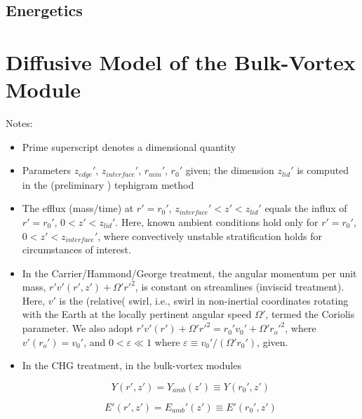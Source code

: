 \documentclass{article}
\begin{document}
\subsection{Energetics}

\section{Diffusive Model of the Bulk-Vortex Module}

\begin{figure}[h!]
	\centering
	\def\svgwidth{0.7\columnwidth}
	
\end{figure}

Notes:
\begin{itemize}

\item Prime superscript denotes a dimensional quantity
\item Parameters $z_{edge}'$, $z_{interface}'$, $r_{min}'$, $r_0'$ given; the dimension $z_{lid}'$ is computed in the (preliminary ) tephigram method
\item The efflux (mass/time) at $r' = r_0'$, $z_{interface}' < z' < z_{lid}'$ equals the influx of $r'=r_0'$, $0 < z' < z_{lid}'$. Here, known ambient conditions hold only for $r' = r_0'$, $0 < z' < z_{interface}'$, where convectively unstable stratification holds for circumstances of interest.

\item In the Carrier/Hammond/George treatment, the angular momentum per unit mass, $r' v'(r', z') + \Omega' r'^2$, is constant on streamlines (inviscid treatment). Here, $v'$ is the (relative( swirl, i.e., swirl in non-inertial coordinates rotating with the Earth at the locally pertinent angular speed $\Omega'$, termed the Coriolis parameter. We also adopt $r' v' (r') + \Omega' r'^2 = r_0' v_0' + \Omega' r_o'^2$, where $v'(r_o') = v_0'$, and $0 < \varepsilon \ll 1$ where $\varepsilon \equiv v_0' / (\Omega' r_0')$, given.

\item In the CHG treatment, in the bulk-vortex modules

\begin{equation}
	Y(r', z') = Y_{amb}(z') \equiv Y(r_0', z')
\end{equation}

\begin{equation}
	E'(r',z') = E_{amb}'(z') \equiv E'(r_0', z')
\end{equation}


\end{itemize}
\end{document}
